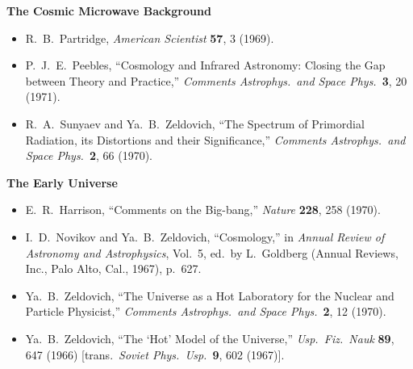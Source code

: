 \medskip
\noindent\textbf{The Cosmic Microwave Background}\par
\begin{itemize}
  \item[\(\square\)] R.~B.~Partridge,
  \emph{American Scientist} \textbf{57}, 3 (1969).

  \item[\(\square\)] P.~J.~E.~Peebles,
  ``Cosmology and Infrared Astronomy: Closing the Gap between Theory and
  Practice,'' \emph{Comments Astrophys.\ and Space Phys.}\ \textbf{3},
  20 (1971).

  \item[\(\square\)] R.~A.~Sunyaev and Ya.~B.~Zeldovich,
  ``The Spectrum of Primordial Radiation, its Distortions and their
  Significance,'' \emph{Comments Astrophys.\ and Space Phys.}\ \textbf{2},
  66 (1970).
\end{itemize}

\medskip
\noindent\textbf{The Early Universe}\par
\begin{itemize}
  \item[\(\square\)] E.~R.~Harrison, ``Comments on the Big-bang,''
  \emph{Nature} \textbf{228}, 258 (1970).

  \item[\(\square\)] I.~D.~Novikov and Ya.~B.~Zeldovich, ``Cosmology,'' in
  \emph{Annual Review of Astronomy and Astrophysics}, Vol.~5,
  ed.\ by L.~Goldberg (Annual Reviews, Inc., Palo Alto, Cal., 1967), p.~627.

  \item[\(\square\)] Ya.~B.~Zeldovich,
  ``The Universe as a Hot Laboratory for the Nuclear and Particle Physicist,''
  \emph{Comments Astrophys.\ and Space Phys.}\ \textbf{2}, 12 (1970).

  \item[\(\square\)] Ya.~B.~Zeldovich,
  ``The `Hot' Model of the Universe,'' \emph{Usp.\ Fiz.\ Nauk}
  \textbf{89}, 647 (1966)
  [trans.\ \emph{Soviet Phys.\ Usp.}\ \textbf{9}, 602 (1967)].
\end{itemize}

